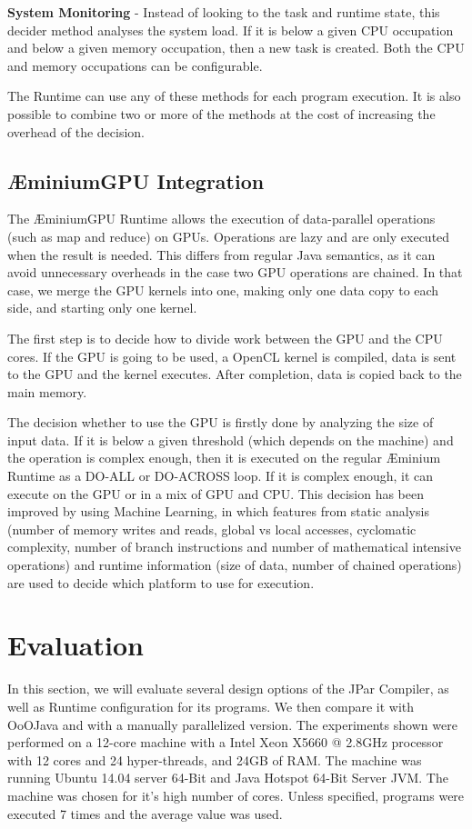 \documentclass[smallextended]{svjour3}
\begin{document}
\textbf{System Monitoring} - Instead of looking to the task and runtime state, this decider method analyses the system load. If it is below a given CPU occupation and below a given memory occupation, then a new task is created. Both the CPU and memory occupations can be configurable.


The Runtime can use any of these methods for each program execution. It is also possible to combine two or more of the methods at the cost of increasing the overhead of the decision.

\subsection{ÆminiumGPU Integration}

The ÆminiumGPU Runtime allows the execution of data-parallel operations (such as map and reduce) on GPUs. Operations are lazy and are only executed when the result is needed. This differs from regular Java semantics, as it can avoid unnecessary overheads in the case two GPU operations are chained. In that case, we merge the GPU kernels into one, making only one data copy to each side, and starting only one kernel.

The first step is to decide how to divide work between the GPU and the CPU cores. If the GPU is going to be used, a OpenCL kernel is compiled, data is sent to the GPU and the kernel executes. After completion, data is copied back to the main memory.

The decision whether to use the GPU is firstly done by analyzing the size of input data. If it is below a given threshold (which depends on the machine) and the operation is complex enough, then it is executed on the regular Æminium Runtime as a DO-ALL or DO-ACROSS loop. If it is complex enough, it can execute on the GPU or in a mix of GPU and CPU. This decision has been improved by using Machine Learning\cite{fonseca2013aeminiumgpu}, in which features from static analysis (number of memory writes and reads, global vs local accesses, cyclomatic complexity, number of branch instructions and number of mathematical intensive operations) and runtime information (size of data, number of chained operations) are used to decide which platform to use for execution.


\section{Evaluation}
\label{sec:evaluation}

In this section, we will evaluate several design options of the JPar Compiler, as well as Runtime configuration for its programs. We then compare it with OoOJava and with a manually parallelized version. The experiments shown were performed on a 12-core machine with a Intel Xeon X5660 @ 2.8GHz processor with 12 cores and 24 hyper-threads, and 24GB of RAM. The machine was running Ubuntu 14.04 server 64-Bit and Java Hotspot 64-Bit Server JVM. The machine was chosen for it's high number of cores. Unless specified, programs were executed 7 times and the average value was used.
\end{document}
